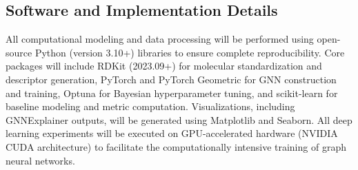 \subsection{Software and Implementation Details}

All computational modeling and data processing will be performed using open-source Python (version 3.10+) libraries to ensure complete reproducibility. Core packages will include RDKit (2023.09+) for molecular standardization and descriptor generation, PyTorch and PyTorch Geometric for GNN construction and training, Optuna for Bayesian hyperparameter tuning, and scikit-learn for baseline modeling and metric computation. Visualizations, including GNNExplainer outputs, will be generated using Matplotlib and Seaborn. All deep learning experiments will be executed on GPU-accelerated hardware (NVIDIA CUDA architecture) to facilitate the computationally intensive training of graph neural networks.

\newpage
